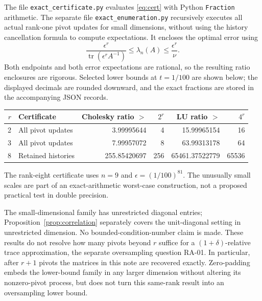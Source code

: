 \documentclass[11pt]{article}
\theoremstyle{remark}
\DeclareMathOperator{\tr}{tr}
\newcommand{\eps}{\epsilon}
\begin{document}
The file \texttt{exact\_certificate.py} evaluates \eqref{eq:cert} with Python
\texttt{Fraction} arithmetic. The separate file
\texttt{exact\_enumeration.py} recursively executes all actual rank-one pivot
updates for small dimensions, without using the history cancellation formula
to compute expectations. It encloses the optimal error using
\[
 \frac{\eps^r}{\tr(\eps^r A^{-1})}\le\lambda_n(A)
 \le\frac{\eps^r}{\nu}.
\]
Both endpoints and both error expectations are rational, so the resulting
ratio enclosures are rigorous. Selected lower bounds at $t=1/100$ are shown
below; the displayed decimals are rounded downward, and the exact fractions
are stored in the accompanying JSON records.

\begin{center}
\small
\begin{tabular}{@{}r l r r r r@{}}
\toprule
$r$ & Certificate & Cholesky ratio $>$ & $2^r$ & LU ratio $>$ & $4^r$\\
\midrule
2 & All pivot updates & 3.99995644 & 4 & 15.99965154 & 16\\
3 & All pivot updates & 7.99957072 & 8 & 63.99313178 & 64\\
8 & Retained histories & 255.85420697 & 256 & 65461.37522779 & 65536\\
\bottomrule
\end{tabular}
\end{center}

The rank-eight certificate uses $n=9$ and $\eps=(1/100)^{81}$.
The unusually small scales are part of an exact-arithmetic worst-case
construction, not a proposed practical test in double precision.

The small-dimensional family has unrestricted diagonal entries;
Proposition~\ref{prop:correlation} separately covers the unit-diagonal setting
in unrestricted dimension. No bounded-condition-number claim is made.
These results do not resolve how many pivots beyond $r$ suffice for a
$(1+\delta)$-relative trace approximation, the separate oversampling question
RA-01. In particular, after $r+1$ pivots the matrices in this note are recovered
exactly. Zero-padding embeds the lower-bound family in any larger dimension
without altering its nonzero-pivot process, but does not turn this same-rank
result into an oversampling lower bound.
\end{document}
